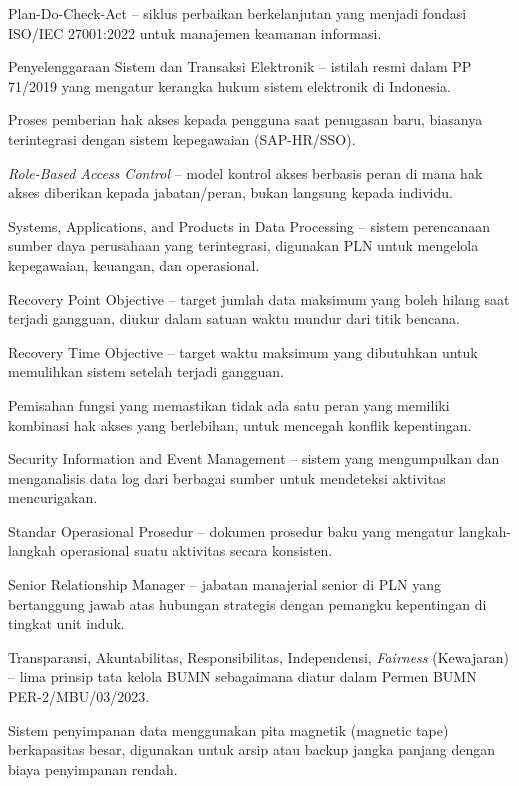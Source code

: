 \documentclass[12pt,a4paper]{report}
\begin{document}
{\begin{description}[leftmargin=2.5cm, style=nextline]
    \item[PDCA] Plan-Do-Check-Act -- siklus perbaikan berkelanjutan yang menjadi fondasi ISO/IEC 27001:2022 untuk manajemen keamanan informasi.
    \item[PSTE] Penyelenggaraan Sistem dan Transaksi Elektronik -- istilah resmi dalam PP 71/2019 yang mengatur kerangka hukum sistem elektronik di Indonesia.
    \item[Provisioning] Proses pemberian hak akses kepada pengguna saat penugasan baru, biasanya terintegrasi dengan sistem kepegawaian (SAP-HR/SSO).
    \item[RBAC] \textit{Role-Based Access Control} -- model kontrol akses berbasis peran di mana hak akses diberikan kepada jabatan/peran, bukan langsung kepada individu.
    \item[SAP] Systems, Applications, and Products in Data Processing -- sistem perencanaan sumber daya perusahaan yang terintegrasi, digunakan PLN untuk mengelola kepegawaian, keuangan, dan operasional.
    \item[RPO] Recovery Point Objective -- target jumlah data maksimum yang boleh hilang saat terjadi gangguan, diukur dalam satuan waktu mundur dari titik bencana.
    \item[RTO] Recovery Time Objective -- target waktu maksimum yang dibutuhkan untuk memulihkan sistem setelah terjadi gangguan.
    \item[\textit{Segregation of Duties}] Pemisahan fungsi yang memastikan tidak ada satu peran yang memiliki kombinasi hak akses yang berlebihan, untuk mencegah konflik kepentingan.
    \item[SIEM] Security Information and Event Management -- sistem yang mengumpulkan dan menganalisis data log dari berbagai sumber untuk mendeteksi aktivitas mencurigakan.
    \item[SOP] Standar Operasional Prosedur -- dokumen prosedur baku yang mengatur langkah-langkah operasional suatu aktivitas secara konsisten.
    \item[SRM] Senior Relationship Manager -- jabatan manajerial senior di PLN yang bertanggung jawab atas hubungan strategis dengan pemangku kepentingan di tingkat unit induk.
    \item[TARIF] Transparansi, Akuntabilitas, Responsibilitas, Independensi, \textit{Fairness} (Kewajaran) -- lima prinsip tata kelola BUMN sebagaimana diatur dalam Permen BUMN PER-2/MBU/03/2023.
    \item[Tape Library] Sistem penyimpanan data menggunakan pita magnetik (magnetic tape) berkapasitas besar, digunakan untuk arsip atau backup jangka panjang dengan biaya penyimpanan rendah.

\end{description}}
\end{document}
